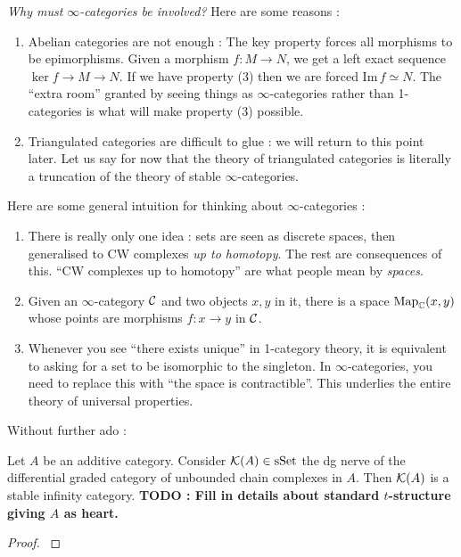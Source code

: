 \documentclass{article}
\begin{document}
\emph{Why must $\infty$-categories be involved?}
Here are some reasons : 
\begin{enumerate}
  \item Abelian categories are not enough : 
  The key property forces all morphisms to be epimorphisms.
  Given a morphism $f : M \to N$, 
  we get a left exact sequence $\ker f \to M \to N$.
  If we have property (3) then we are forced $\mathrm{Im}\,f \simeq N$.
  The ``extra room'' granted by seeing things as 
  $\infty$-categories rather than 1-categories is 
  what will make property (3) possible.
  
  \item Triangulated categories are difficult to glue : 
  we will return to this point later.
  Let us say for now that 
  the theory of triangulated categories is literally a truncation
  of the theory of stable $\infty$-categories.\cite[Thm. 1.1.2.14]{lurie-HA}
\end{enumerate}
Here are some general intuition for thinking about $\infty$-categories : 
\begin{enumerate}
  \item There is really only one idea : 
  sets are seen as discrete spaces,
  then generalised to CW complexes \emph{up to homotopy}.
  The rest are consequences of this.
  ``CW complexes up to homotopy'' are what people
  mean by \emph{spaces}.
  \item Given an $\infty$-category $\mathcal{C}$ and two objects $x , y$ in it,
  there is a space $\mathrm{Map}_{\mathbb{C}}(x , y)$ whose points are morphisms 
  $f : x \to y$ in $\mathcal{C}$.
  \item Whenever you see ``there exists unique'' in 1-category theory,
  it is equivalent to asking for a set to be isomorphic to the singleton.
  In $\infty$-categories, you need to replace
  this with ``the space is contractible''.
  This underlies the entire theory of universal properties.
\end{enumerate}
Without further ado :
\begin{prop}

  Let $A$ be an additive category.
  Consider $\mathcal{K}(A) \in \operatorname{sSet}$ 
  the dg nerve of the differential graded
  category of unbounded chain complexes in $A$.
  Then $\mathcal{K}(A)$ is a stable infinity category.
  \textbf{TODO : Fill in details about standard $t$-structure
  giving $A$ as heart.}
\end{prop}
\begin{proof}
  \cite[Prop. 1.3.2.10]{lurie-HA}
\end{proof}
\cite[Remark 1.3.1.12]{lurie-HA}
\end{document}
